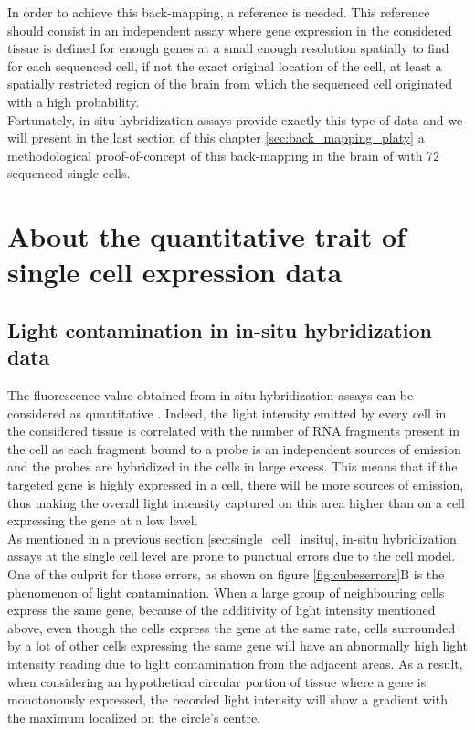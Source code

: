 	In order to achieve this back-mapping, a reference is needed. This reference should consist in an independent assay where gene expression in the considered tissue is defined for enough genes at a small enough resolution spatially to find for each sequenced cell, if not the exact original location of the cell, at least a spatially restricted region of the brain from which the sequenced cell originated with a high probability.\\
	
	Fortunately, in-situ hybridization assays provide exactly this type of data and we will present in the last section of this chapter \ref{sec:back_mapping_platy} a methodological proof-of-concept of this back-mapping in the brain of \platy{} with 72 sequenced single cells.

\section{About the quantitative trait of single cell expression data}\label{sec:quantitative_single_cell}
  \subsection{Light contamination in in-situ hybridization data}
  The fluorescence value obtained from in-situ hybridization assays can be considered as quantitative \cite{dorresteijn90}. Indeed, the light intensity emitted by every cell in the considered tissue is correlated with the number of RNA fragments present in the cell as each fragment bound to a probe is an independent sources of emission and the probes are hybridized in the cells in large excess. This means that if the targeted gene is highly expressed in a cell, there will be more sources of emission, thus making the overall light intensity captured on this area higher than on a cell expressing the gene at a low level. \\
  
  As mentioned in a previous section \ref{sec:single_cell_insitu}, in-situ hybridization assays at the single cell level are prone to punctual errors due to the cell model. One of the culprit for those errors, as shown on figure \ref{fig:cubeserrors}B is the phenomenon of light contamination. When a large group of neighbouring cells express the same gene, because of the additivity of light intensity mentioned above, even though the cells express the gene at the same rate, cells surrounded by a lot of other cells expressing the same gene will have an abnormally high light intensity reading due to light contamination from the adjacent areas. As a result, when considering an hypothetical circular portion of tissue where a gene is monotonously expressed, the recorded light intensity will show a gradient with the maximum localized on the circle's centre.\\
  

